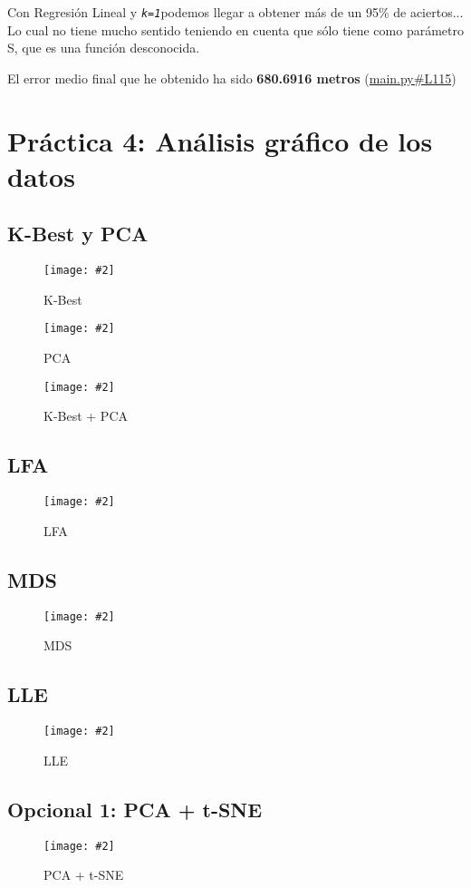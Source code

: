 \documentclass[
12pt, 
spanish, 
singlespacing,
headsepline
]{article}
\newcommand{\image}[2]{
\begin{figure}[H]
	\caption{#1}
	\centering
	\texttt{[image: \#2]}
\end{figure}
}
\begin{document}
Con Regresión Lineal y \texttt{\textit{k=1}}podemos llegar a obtener más de un 95\% de aciertos... Lo cual no tiene mucho sentido teniendo en cuenta que sólo tiene como parámetro S, que es una función desconocida.

El error medio final que he obtenido ha sido \textbf{680.6916 metros} (\href{https://github.com/uo272509/InteligenciaNegocioPL/blob/2cbbd80f0cc88aa40bd462bec7e322e89a958301/Prac3/main.py\#L115}{main.py\#L115})
\newpage

\section{Práctica 4: Análisis gráfico de los datos}
\subsection{K-Best y PCA}
\image{K-Best}{pl4/Figure_1.png}
\image{PCA}{pl4/Figure_2.png}
\image{K-Best + PCA}{pl4/Figure_3.png}
\subsection{LFA}
\image{LFA}{pl4/Figure_4.png}
\subsection{MDS}
\image{MDS}{pl4/Figure_5.png}
\subsection{LLE}
\image{LLE}{pl4/Figure_6.png}
\subsection{Opcional 1: PCA + t-SNE}
\image{PCA + t-SNE}{pl4/Figure_7.png}
\end{document}
